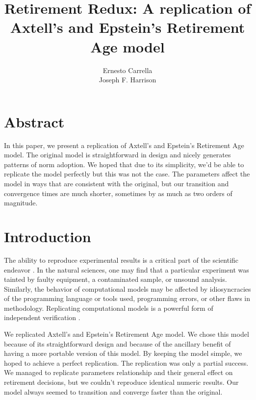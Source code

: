 \documentclass[runningheads,a4paper]{article}
\newcommand{\doctitle}[0]{Retirement Redux: A replication of Axtell's and Epstein's Retirement Age model}
\begin{document}
\title{\doctitle}
\author{Ernesto Carrella \\ Joseph F. Harrison}

\maketitle

\section*{Abstract}
In this paper, we present a replication of Axtell's and Epstein's Retirement Age model\cite{axtell_coordination_2006}. 
The original model is straightforward in design and nicely generates patterns of norm adoption. 
We hoped that due to its simplicity, we'd be able to replicate the model perfectly but this was not the case.
The parameters affect the model in ways that are consistent with the original, but our transition and convergence times
are much shorter, sometimes by as much as two orders of magnitude.

\section{Introduction}
\label{sec:intro}

The ability to reproduce experimental results is a critical part of the scientific endeavor \cite{popper1959logic}. 
In the natural sciences, one may find that a particular experiment was tainted by faulty equipment, a contaminated sample, or unsound analysis. 
Similarly, the behavior of computational models may be affected by idiosyncracies of the programming language or tools used, programming errors, or other flaws in methodology. Replicating computational models is a powerful form of independent verification \cite{wilensky2007making,rand2006verification}.

We replicated Axtell's and Epstein's Retirement Age model\cite{axtell_coordination_2006}. 
We chose this model because of its straightforward design and because of the ancillary benefit of having a more portable version of this model.
By keeping the model simple, we hoped to achieve a perfect replication. The replication was only a partial success.
We managed to replicate parameters relationship and their general effect on retirement decisions, but we couldn't reproduce identical numeric results.
Our model always seemed to transition and converge faster than the original.
\end{document}
